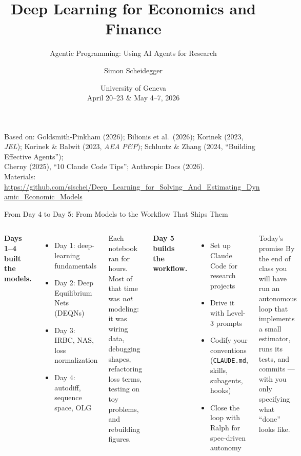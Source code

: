 \documentclass[aspectratio=169,10pt]{beamer}
\title[Deep Learning -- Geneva 2026]%
{Deep Learning for Economics and Finance}
\subtitle{Agentic Programming: Using AI Agents for Research}
\author{Simon Scheidegger}
\institute[HEC Lausanne]{HEC, University of Lausanne}
\date{University of Geneva\\April 20--23 \& May 4--7, 2026}
\newcommand{\emphc}[1]{\textcolor{harvardcrimson}{#1}}
\begin{document}

{
\begin{frame}
\titlepage
\vspace{-0.4cm}
\begin{center}
{\footnotesize Based on: Goldsmith-Pinkham (2026); Bilionis et al.\ (2026);
Korinek (2023, \emph{JEL}); Korinek \& Balwit (2023, \emph{AEA P\&P});
Schluntz \& Zhang (2024, ``Building Effective Agents'');\\
Cherny (2025), ``10 Claude Code Tips''; Anthropic Docs (2026).}\\[4pt]
{\footnotesize Materials: \url{https://github.com/sischei/Deep_Learning_for_Solving_And_Estimating_Dynamic_Economic_Models}}
\end{center}
\end{frame}
}

\begin{frame}{From Day 4 to Day 5: From Models to the Workflow That Ships Them}
\small
\begin{columns}[T]
\textbf{Days 1--4 built the models.}
\begin{itemize}\itemsep0pt
    \item Day 1: deep-learning fundamentals
    \item Day 2: Deep Equilibrium Nets (DEQNs)
    \item Day 3: IRBC, NAS, loss normalization
    \item Day 4: autodiff, sequence space, OLG
\end{itemize}

\vspace{0.3em}
{\scriptsize Each notebook ran for hours. Most of that time was \emph{not}
modeling: it was wiring data, debugging shapes, refactoring loss terms,
testing on toy problems, and rebuilding figures.}

\textbf{Day 5 builds the \emphc{workflow}.}
\begin{itemize}\itemsep0pt
    \item Set up Claude Code for research projects
    \item Drive it with Level-3 prompts
    \item Codify your conventions (\texttt{CLAUDE.md}, skills, subagents, hooks)
    \item Close the loop with \emphc{Ralph} for spec-driven autonomy
\end{itemize}

\vspace{0.3em}
\begin{alertblock}{Today's promise}
\scriptsize By the end of class you will have run an autonomous loop that
implements a small estimator, runs its tests, and commits --- with you only
specifying what ``done'' looks like.
\end{alertblock}
\end{columns}
\end{frame}
\end{document}
